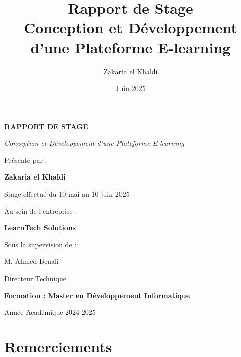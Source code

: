 \documentclass[12pt, a4paper]{report}
\title{\Huge\bfseries\color{primary} Rapport de Stage \\ 
       \Large Conception et Développement d'une Plateforme E-learning}
\author{\Large Zakaria el Khaldi}
\date{\large Juin 2025}
\begin{document}
\begin{titlepage}
  \centering
  \vspace*{2cm}
  
  {\Huge\bfseries\color{primary} RAPPORT DE STAGE\par}
  \vspace{1.5cm}
  {\Large\itshape Conception et Développement d'une Plateforme E-learning\par}
  \vspace{3cm}
  
  {\large Présenté par :\par}
  \vspace{0.5cm}
  {\Large\bfseries Zakaria el Khaldi\par}
  \vspace{1.5cm}
  
  {\large Stage effectué du 10 mai au 10 juin 2025\par}
  \vspace{0.5cm}
  {\large Au sein de l'entreprise :\par}
  \vspace{0.5cm}
  {\large\bfseries LearnTech Solutions\par}
  \vspace{3cm}
  
  {\large Sous la supervision de :\par}
  \vspace{0.5cm}
  {\large M. Ahmed Benali\par}
  \vspace{0.5cm}
  {\large Directeur Technique\par}
  \vfill
  
  {\large\bfseries Formation : Master en Développement Informatique\par}
  \vspace{0.5cm}
  {\large Année Académique 2024-2025\par}
\end{titlepage}

\chapter*{Remerciements}
\thispagestyle{fancy}
\end{document}
